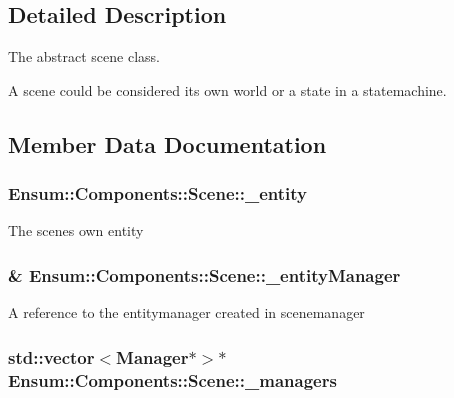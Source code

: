 \subsection{Detailed Description}
The abstract scene class. 

A scene could be considered it\textquotesingle{}s own world or a state in a statemachine. 

\subsection{Member Data Documentation}
\subsubsection[{\texorpdfstring{\+\_\+entity}{_entity}}]{ Ensum\+::\+Components\+::\+Scene\+::\+\_\+entity\hspace{0.3cm}{\ttfamily [protected]}}\hypertarget{class_ensum_1_1_components_1_1_scene_a8d36e81874a5b07e3edbd8720b8b289e}{}\label{class_ensum_1_1_components_1_1_scene_a8d36e81874a5b07e3edbd8720b8b289e}
The scenes own entity 
\subsubsection[{\texorpdfstring{\+\_\+entity\+Manager}{_entityManager}}]{\& Ensum\+::\+Components\+::\+Scene\+::\+\_\+entity\+Manager\hspace{0.3cm}{\ttfamily [protected]}}\hypertarget{class_ensum_1_1_components_1_1_scene_af7eb8e3279c5b6768f442ae05b44e75f}{}\label{class_ensum_1_1_components_1_1_scene_af7eb8e3279c5b6768f442ae05b44e75f}
A reference to the entitymanager created in scenemanager 
\subsubsection[{\texorpdfstring{\+\_\+managers}{_managers}}]{\setlength{\rightskip}{0pt plus 5cm}std\+::vector$<${\bf Manager}$\ast$$>$$\ast$ Ensum\+::\+Components\+::\+Scene\+::\+\_\+managers\hspace{0.3cm}{\ttfamily [protected]}}\hypertarget{class_ensum_1_1_components_1_1_scene_a9f7c53f74805c8bf7461f9ff2c818be7}{}\label{class_ensum_1_1_components_1_1_scene_a9f7c53f74805c8bf7461f9ff2c818be7}


